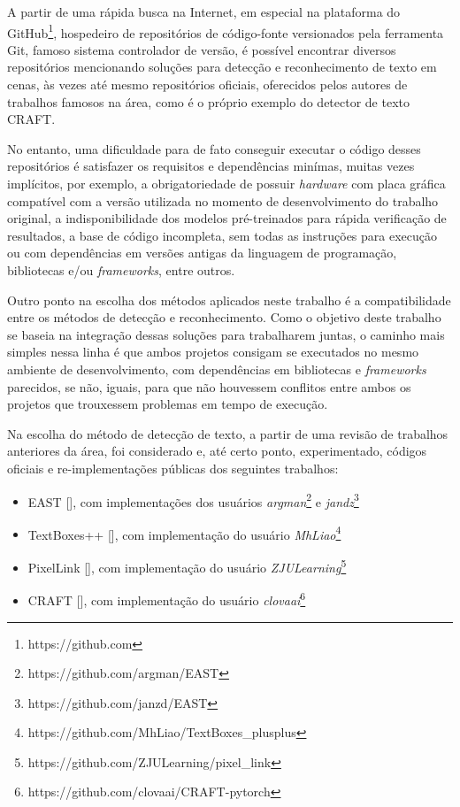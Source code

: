A partir de uma rápida busca na Internet, em especial na plataforma do GitHub\footnote{https://github.com}, hospedeiro de repositórios de 
código-fonte versionados pela ferramenta Git, famoso sistema controlador de versão, é possível encontrar diversos repositórios mencionando 
soluções para detecção e reconhecimento de texto em cenas, às vezes até mesmo repositórios oficiais, oferecidos pelos autores de trabalhos 
famosos na área, como é o próprio exemplo do detector de texto CRAFT.

No entanto, uma dificuldade para de fato conseguir executar o código desses repositórios é satisfazer os requisitos e dependências 
minímas, muitas vezes implícitos, por exemplo, a obrigatoriedade de possuir \textit{hardware} com placa gráfica compatível com a versão 
utilizada no momento de desenvolvimento do trabalho original, a indisponibilidade dos modelos pré-treinados para rápida verificação de 
resultados, a base de código incompleta, sem todas as instruções para execução ou com dependências em versões antigas da linguagem de 
programação, bibliotecas e/ou \textit{frameworks}, entre outros.

Outro ponto na escolha dos métodos aplicados neste trabalho é a compatibilidade entre os métodos de detecção e reconhecimento. 
Como o objetivo deste trabalho se baseia na integração dessas soluções para trabalharem juntas, o caminho mais simples nessa linha é 
que ambos projetos consigam se executados no mesmo ambiente de desenvolvimento, com dependências em bibliotecas e \textit{frameworks} parecidos, 
se não, iguais, para que não houvessem conflitos entre ambos os projetos que trouxessem problemas em tempo de execução.

Na escolha do método de detecção de texto, a partir de uma revisão de trabalhos anteriores da área, foi considerado e, até certo ponto, 
experimentado, códigos oficiais e re-implementações públicas dos seguintes trabalhos:

\begin{itemize}
    \item EAST [], com implementações dos usuários \textit{argman}\footnote{https://github.com/argman/EAST} e 
    \textit{jandz}\footnote{https://github.com/janzd/EAST}

    \item TextBoxes++ [], com implementação do usuário \textit{MhLiao}\footnote{https://github.com/MhLiao/TextBoxes\_plusplus}

    \item PixelLink [], com implementação do usuário \textit{ZJULearning}\footnote{https://github.com/ZJULearning/pixel\_link}

    \item CRAFT [], com implementação do usuário \textit{clovaai}\footnote{https://github.com/clovaai/CRAFT-pytorch}
\end{itemize}

